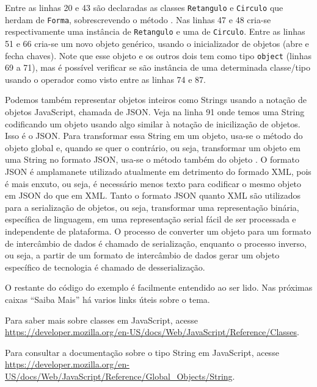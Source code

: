 Entre as linhas 20 e 43 são declaradas as classes \texttt{Retangulo} e \texttt{Circulo} que herdam de \texttt{Forma}, sobrescrevendo o método . Nas linhas 47 e 48 cria-se respectivamente uma instância de \texttt{Retangulo} e uma de \texttt{Circulo}. Entre as linhas 51 e 66 cria-se um novo objeto genérico, usando o inicializador de objetos (abre e fecha chaves). Note que esse objeto e os outros dois tem como tipo \texttt{object} (linhas 69 a 71), mas é possível verificar se são instância de uma determinada classe/tipo usando o operador  como visto entre as linhas 74 e 87.

Podemos também representar objetos inteiros como Strings usando a notação de objetos JavaScript, chamada de JSON. Veja na linha 91 onde temos uma String codificando um objeto usando algo similar à notação de inicilização de objetos. Isso é o JSON. Para transformar essa String em um objeto, usa-se o método  do objeto global  e, quando se quer o contrário, ou seja, transformar um objeto em uma String no formato JSON, usa-se o método  também do objeto . O formato JSON é amplamanete utilizado atualmente em detrimento do formado XML, pois é mais enxuto, ou seja, é necessário menos texto para codificar o mesmo objeto em JSON do que em XML. Tanto o formato JSON quanto XML são utilizados para a serialização de objetos, ou seja, transformar uma representação binária, específica de linguagem, em uma representação serial fácil de ser processada e independente de plataforma. O processo de converter um objeto para um formato de intercâmbio de dados é chamado de serialização, enquanto o processo inverso, ou seja, a partir de um formato de intercâmbio de dados gerar um objeto específico de tecnologia é chamado de desserialização.

O restante do código do exemplo é facilmente entendido ao ser lido. Nas próximas caixas ``Saiba Mais'' há varios links úteis sobre o tema.

\begin{saibaMais}
    Para saber mais sobre classes em JavaScript, acesse \url{https://developer.mozilla.org/en-US/docs/Web/JavaScript/Reference/Classes}.
\end{saibaMais}

\begin{saibaMais}
    Para consultar a documentação sobre o tipo String em JavaScript, acesse \url{https://developer.mozilla.org/en-US/docs/Web/JavaScript/Reference/Global_Objects/String}.
\end{saibaMais}

